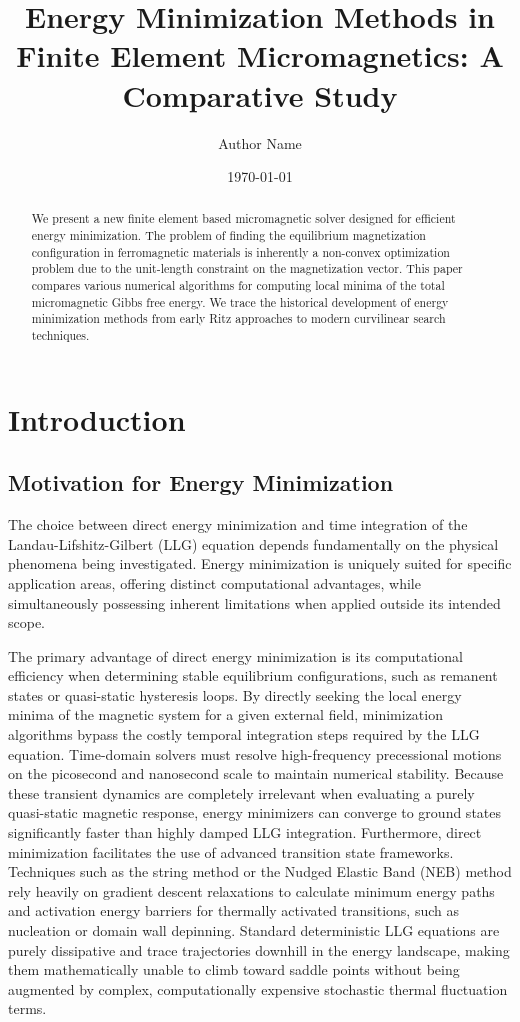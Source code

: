 \documentclass[10pt, a4paper, twocolumn]{article}
\title{Energy Minimization Methods in Finite Element Micromagnetics: A Comparative Study}
\author{Author Name}
\date{\today}
\begin{document}
\maketitle

\begin{abstract}
We present a new finite element based micromagnetic solver designed for efficient energy minimization. The problem of finding the equilibrium magnetization configuration in ferromagnetic materials is inherently a non-convex optimization problem due to the unit-length constraint on the magnetization vector. This paper compares various numerical algorithms for computing local minima of the total micromagnetic Gibbs free energy. We trace the historical development of energy minimization methods from early Ritz approaches to modern curvilinear search techniques.
\end{abstract}

\section{Introduction}

\subsection{Motivation for Energy Minimization}
The choice between direct energy minimization and time integration of the Landau-Lifshitz-Gilbert (LLG) equation depends fundamentally on the physical phenomena being investigated. Energy minimization is uniquely suited for specific application areas, offering distinct computational advantages, while simultaneously possessing inherent limitations when applied outside its intended scope.

The primary advantage of direct energy minimization is its computational efficiency when determining stable equilibrium configurations, such as remanent states or quasi-static hysteresis loops. By directly seeking the local energy minima of the magnetic system for a given external field, minimization algorithms bypass the costly temporal integration steps required by the LLG equation. Time-domain solvers must resolve high-frequency precessional motions on the picosecond and nanosecond scale to maintain numerical stability. Because these transient dynamics are completely irrelevant when evaluating a purely quasi-static magnetic response, energy minimizers can converge to ground states significantly faster than highly damped LLG integration. Furthermore, direct minimization facilitates the use of advanced transition state frameworks. Techniques such as the string method or the Nudged Elastic Band (NEB) method rely heavily on gradient descent relaxations to calculate minimum energy paths and activation energy barriers for thermally activated transitions, such as nucleation or domain wall depinning. Standard deterministic LLG equations are purely dissipative and trace trajectories downhill in the energy landscape, making them mathematically unable to climb toward saddle points without being augmented by complex, computationally expensive stochastic thermal fluctuation terms.
\end{document}
